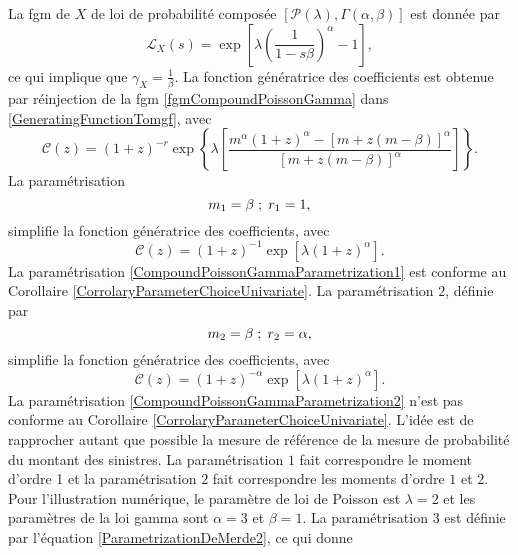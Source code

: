 La \gls{fgm} de $X$ de loi de probabilité composée $\left[\mathcal{P}(\lambda),\Gamma(\alpha,\beta)\right]$ est donnée par 
\begin{equation}\label{fgmCompoundPoissonGamma}
\mathcal{L}_{X}(s)=\exp\left[\lambda\left(\frac{1}{1-s\beta}\right)^{\alpha}-1\right],
\end{equation}
ce qui implique que $\gamma_{X}=\frac{1}{\beta}$. La fonction génératrice des coefficients est obtenue par réinjection de la \gls{fgm} \eqref{fgmCompoundPoissonGamma} dans \eqref{GeneratingFunctionTomgf}, avec
\begin{equation}\label{CoeficientGeneratingFunctionCompoundPoissonExponential}
\mathcal{C}(z)=(1+z)^{-r}\exp\left\{\lambda\left[\frac{m^{\alpha}(1+z)^{\alpha}-\left[m+z(m-\beta)\right]^{\alpha}}{\left[m+z(m-\beta)\right]^{\alpha}}\right]\right\}.
\end{equation}
La paramétrisation
\begin{equation}\label{CompoundPoissonGammaParametrization1}
m_{1}=\beta\hspace{0.1cm};\hspace{0.1cm}r_{1}=1,
\end{equation}
simplifie la fonction génératrice des coefficients, avec 
\begin{equation*}
\mathcal{C}(z)=(1+z)^{-1}\exp\left[\lambda(1+z)^{\alpha}\right].
\end{equation*}
La paramétrisation \eqref{CompoundPoissonGammaParametrization1} est conforme au Corollaire \ref{CorrolaryParameterChoiceUnivariate}. La paramétrisation $2$, définie par
\begin{equation}\label{CompoundPoissonGammaParametrization2}
m_{2}=\beta\hspace{0.1cm};\hspace{0.1cm}r_{2}=\alpha,
\end{equation}
simplifie la fonction génératrice des coefficients, avec 
\begin{equation*}
\mathcal{C}(z)=(1+z)^{-\alpha}\exp\left[\lambda(1+z)^{\alpha}\right].
\end{equation*}
La paramétrisation \eqref{CompoundPoissonGammaParametrization2} n\rq{}est pas conforme au Corollaire \ref{CorrolaryParameterChoiceUnivariate}. L\rq{}idée est de rapprocher autant que possible la mesure de référence de la mesure de probabilité du montant des sinistres. La paramétrisation $1$ fait correspondre le moment d\rq{}ordre 1 et la paramétrisation $2$ fait correspondre les moments d\rq{}ordre $1$ et $2$. Pour l\rq{}illustration numérique, le paramètre de loi de Poisson est $\lambda=2$ et les paramètres de la loi gamma sont $\alpha=3$ et $\beta=1$. La paramétrisation $3$ est définie par l\rq{}équation \eqref{ParametrizationDeMerde2}, ce qui donne 
